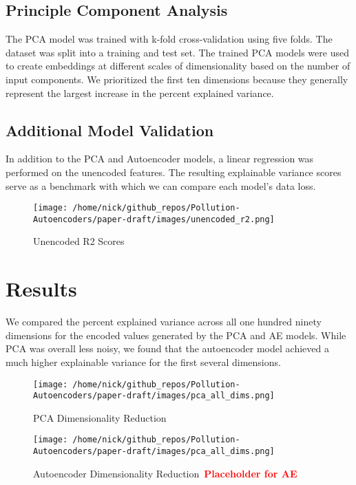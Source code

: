 \documentclass{article}
\newcommand\note[1]{\textbf{\textcolor{red}{#1}}}
\begin{document}
\subsection{Principle Component Analysis}
The PCA model was trained with k-fold cross-validation using five folds. The dataset was split into a training and test set. The trained PCA models were used to create embeddings at different scales of dimensionality based on the number of input components. We prioritized the first ten dimensions because they generally represent the largest increase in the percent explained variance.

\subsection{Additional Model Validation}
In addition to the PCA and Autoencoder models, a linear regression was performed on the unencoded features. The resulting explainable variance scores serve as a benchmark with which we can compare each model's data loss. 

\begin{figure}[h!]
    \centering
    \caption{Unencoded R2 Scores}
    \label{fig:pipeline}
    \texttt{[image: /home/nick/github\_repos/Pollution-Autoencoders/paper-draft/images/unencoded\_r2.png]}
\end{figure}

\newpage

\section{Results}

\par We compared the percent explained variance across all one hundred ninety dimensions for the encoded values generated by the PCA and AE models. While PCA was overall less noisy, we found that the autoencoder model achieved a much higher explainable variance for the first several dimensions.

\begin{center}
\begin{figure}[h!]
    \centering
    \texttt{[image: /home/nick/github\_repos/Pollution-Autoencoders/paper-draft/images/pca\_all\_dims.png]} 
    \caption{PCA Dimensionality Reduction}
    \label{fig:pca_dim_reduction}
\end{figure}

\begin{figure}[h!]
    \centering
    \texttt{[image: /home/nick/github\_repos/Pollution-Autoencoders/paper-draft/images/pca\_all\_dims.png]} 
    \caption{Autoencoder Dimensionality Reduction\ \note{Placeholder for AE}}
    \label{fig:ae_dim_reduction}
\end{figure}
\end{center}
\end{document}
